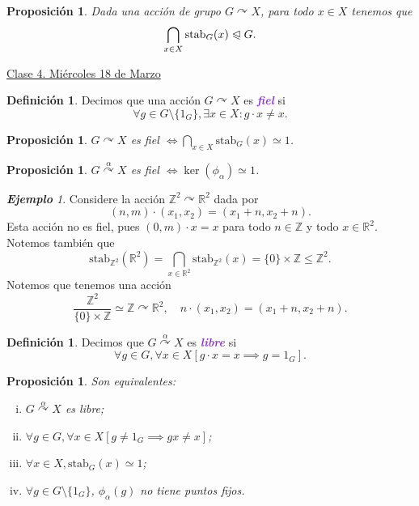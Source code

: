 \documentclass{article}
\newtheorem{proposition}[theorem]{Proposición}
\theoremstyle{definition}
\newtheorem{definition}[theorem]{Definición}
\theoremstyle{remark}
\newtheorem{example}[theorem]{\textbf{Ejemplo}}
\numberwithin{equation}{section}
\newcommand{\R}{\mathbb{R}}
\newcommand{\Z}{\mathbb{Z}}
\newcommand{\acts}{\curvearrowright}
\newcommand{\actsby}[1]{\stackrel{#1}{\acts}}
\renewcommand{\c}{\cdot}
\newcommand{\normal}{\trianglelefteqslant}
\newcommand{\stab}{\mathrm{stab}}
\newcommand{\cor}[1]{\left[ #1 \right]}
\newcommand{\ds}{\displaystyle}
\newcommand{\wea}[1]{\textcolor{BlueViolet}{\textbf{\emph{#1}}}}
\newcommand{\fecha}[1]{\begin{flushright} \underline{#1} \end{flushright}}
\begin{document}
\begin{proposition}
  Dada una acción de grupo $G \acts X$, para todo $x \in X$ tenemos que
  $$\bigcap_{x \in X} \stab_G(x) \normal G.$$
\end{proposition}

\fecha{Clase 4. Miércoles 18 de Marzo}

\begin{definition}
  Decimos que una acción $G \acts X$ es \wea{fiel} si $$\forall g \in G \setminus \{1_G\}, \exists x \in X \colon g\c x \neq x.$$
\end{definition}

\begin{proposition}
  $G \acts X$ es fiel $\ds \iff \bigcap_{x \in X} \stab_G(x) \simeq 1$.
\end{proposition}

\begin{proposition}
  $G \actsby\alpha X$ es fiel $\iff \ker(\phi_\alpha) \simeq 1$.
\end{proposition}

\begin{example}
  Considere la acción $\Z^2 \acts \R^2$ dada por $$(n,m) \c (x_1,x_2) = (x_1 + n, x_2 + n).$$
  Esta acción no es fiel, pues $(0,m) \c x = x$ para todo $n \in \Z$ y todo $x \in \R^2$. Notemos también que
  \[\stab_{\Z^2}(\R^2) = \bigcap_{x \in \R^2} \stab_{\Z^2}(x) = \{0\} \times \Z \leqslant \Z^2.\]
  Notemos que tenemos una acción
  \[\frac{\Z^2}{\{0\} \times \Z} \simeq \Z \acts \R^2, \quad n \c (x_1,x_2) = (x_1 + n, x_2 + n).\]
\end{example}

\begin{definition}
  Decimos que $G \actsby\alpha X$ es \wea{libre} si
  \[\forall g \in G, \forall x \in X \cor{g\c x=x \implies g = 1_G}.\]
\end{definition}

\begin{proposition}
  Son equivalentes:
  \begin{enumerate}[(i)]
    \item $G \actsby\alpha X$ es libre;
    \item $\forall g \in G, \forall x \in X \cor{g \neq 1_G \implies gx \neq  x}$;
    \item $\forall x \in X, \stab_G(x) \simeq 1$;
    \item $\forall g \in G \setminus \{1_G\}$, $\phi_\alpha(g)$ no tiene puntos fijos.
  \end{enumerate}
\end{proposition}
\end{document}
